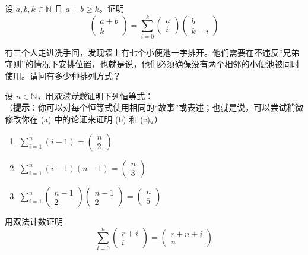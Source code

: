 \begin{exercise}
    设 $a,b,k \in \mathbb{N}$ 且 $a+b \ge k$。证明
    \[\begin{pmatrix}a+b\\k\end{pmatrix} = \sum_{i=0}^{k}\begin{pmatrix}a\\i\end{pmatrix}\begin{pmatrix}b\\k-i\end{pmatrix}\]
\end{exercise}

\begin{exercise}
    有三个人走进洗手间，发现墙上有七个小便池一字排开。他们需要在不违反``兄弟守则''的情况下安排位置，也就是说，他们必须确保没有两个相邻的小便池被同时使用。请问有多少种排列方式？
\end{exercise}

\begin{exercise}
    设 $n \in \mathbb{N}$，用\emph{双法计数}证明下列恒等式：\\
    （\textbf{提示}：你可以对每个恒等式使用相同的``故事''或表述；也就是说，可以尝试稍微修改你在 (a) 中的论证来证明 (b) 和 (c)。）
    \begin{enumerate}[label=(\alph*)]
        \item $\displaystyle \sum_{i=1}^{n}(i-1) = \begin{pmatrix}n\\2\end{pmatrix}$
        \item $\displaystyle \sum_{i=1}^{n}(i-1)(n-1) = \begin{pmatrix}n\\3\end{pmatrix}$
        \item $\displaystyle \sum_{i=1}^{n}\begin{pmatrix}n-1\\2\end{pmatrix}\begin{pmatrix}n-1\\2\end{pmatrix} = \begin{pmatrix}n\\5\end{pmatrix}$
    \end{enumerate}
\end{exercise}

\begin{exercise}
    用双法计数证明
    \[\sum_{i=0}^{n}\begin{pmatrix}r+i\\i\end{pmatrix}=\begin{pmatrix}r+n+i\\n\end{pmatrix}\]
\end{exercise}

